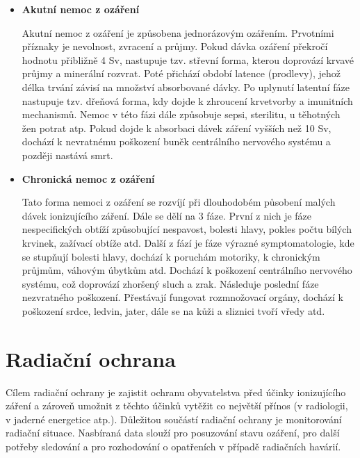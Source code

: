 \begin{itemize}
	\item \textbf{Akutní nemoc z ozáření}
	
		Akutní nemoc z ozáření je způsobena jednorázovým ozářením. Prvotními příznaky je nevolnost, zvracení a průjmy. Pokud dávka ozáření překročí hodnotu přibližně 4 Sv, nastupuje tzv. střevní forma, kterou doprovází krvavé průjmy a minerální rozvrat. Poté přichází období latence (prodlevy), jehož délka trvání závisí na množství absorbované dávky. Po uplynutí latentní fáze nastupuje tzv. dřeňová forma, kdy dojde k zhroucení krvetvorby a imunitních mechanismů. Nemoc v této fázi dále způsobuje sepsi, sterilitu, u těhotných žen potrat atp. Pokud dojde k absorbaci dávek záření vyšších než 10 Sv, dochází k nevratnému poškození buněk centrálního nervového systému a později nastává smrt.
		
	\item \textbf{Chronická nemoc z ozáření}
	
		Tato forma nemoci z ozáření se rozvíjí při dlouhodobém působení malých dávek ionizujícího záření. Dále se dělí na 3 fáze. První z nich je fáze nespecifických obtíží způsobující nespavost, bolesti hlavy, pokles počtu bílých krvinek, zažívací obtíže atd. Další z fází je fáze výrazné symptomatologie, kde se stupňují bolesti hlavy, dochází k poruchám motoriky, k chronickým průjmům, váhovým úbytkům atd. Dochází k poškození centrálního nervového systému, což doprovází zhoršený sluch a zrak. Následuje poslední fáze nezvratného poškození. Přestávají fungovat rozmnožovací orgány, dochází k poškození srdce, ledvin, jater, dále se na kůži a sliznici tvoří vředy atd. 
\end{itemize}

\section{Radiační ochrana} %
Cílem radiační ochrany je zajistit ochranu obyvatelstva před účinky ionizujícího záření a zároveň umožnit z těchto účinků vytěžit co největší přínos (v radiologii, v jaderné energetice atp.). Důležitou součástí radiační ochrany je monitorování radiační situace. Nasbíraná data slouží pro posuzování stavu ozáření, pro další potřeby sledování a pro rozhodování o opatřeních v případě radiačních havárií. %

